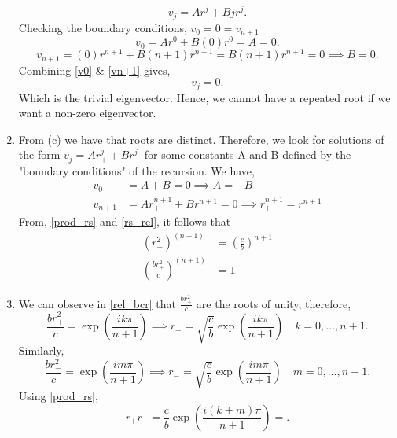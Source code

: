 \documentclass{report}
\begin{document}
\begin{solution}
\begin{enumerate}[label=(\alph*)]
		      \[
			      v_{j} = Ar^j + Bjr^j
			      .\]
		      Checking the boundary conditions,
		      $v_{0} = 0= v_{n+1}$
		      \begin{equation}
			      v_0 = A r^0 + B(0)r^{0} = A = 0 \label{v0}
			      .\end{equation}
		      \begin{equation}
			      v_{n+1} = (0) r^{n+1} + B(n+1)r^{n+1} = B(n+1)r^{n+1} = 0      \implies B =0 \label{vn+1}
			      .\end{equation}
		      Combining \ref{v0} \& \ref{vn+1} gives,
		      \[
			      v_j  =0
			      .\]
		      Which is the trivial eigenvector. Hence, we cannot have a repeated root if we want a non-zero eigenvector.
		\item From (c) we have that roots are distinct. Therefore, we look for solutions of the form $v_{j} = Ar_{+}^j + Br_{-}^j$ for some constants A and B defined by the "boundary conditions" of the recursion.
		      We have,
		      \begin{align}
			      v_{0}   & = A+B = 0 \implies A = -B    \nonumber \\
			      v_{n+1} & =  Ar_{+}^{n+1}  + Br_{-}^{n+1} =0 \implies r_{+}^{n+1} = r_{-}^{n+1} \label{rs_rel}
		      \end{align}
		      From, \ref{prod_rs} and \ref{rs_rel}, it follows that
		      \begin{align}
			      \left( r_{+}^{2} \right)^{(n+1)}          & =  \left( \frac{c}{b} \right)^{n+1} \nonumber \\
			      \left( \frac{br_{+}^2}{c} \right)^{(n+1)} & = 1 \label{rel_bcr}
		      \end{align}
		\item  We can observe in \ref{rel_bcr} that $\frac{br_{+}^{2}}{c}$ are the roots of unity, therefore,
		      \[
			      \frac{br_{+}^{2}}{c} = \exp\left( \frac{ik\pi}{n+1} \right) \implies r_{+} =  \sqrt{\frac{c}{b}} \exp\left( \frac{ik\pi}{n+1} \right) \quad k =0,\dots, n+1
			      .\]
		      Similarly,
		      \[
			      \frac{br_{-}^{2}}{c} = \exp\left( \frac{im\pi}{n+1} \right) \implies r_{-} =  \sqrt{\frac{c}{b}} \exp\left( \frac{im\pi}{n+1} \right) \quad m =0,\dots, n+1
			      .\]
		      Using \ref{prod_rs},
		      \[
			      r_{+}r_{-} =\frac{c}{b} \exp\left( \frac{i\left( k+m \right) \pi}{n+1} \right) =
			      .\]
	\end{enumerate}
\end{solution}
\end{document}
